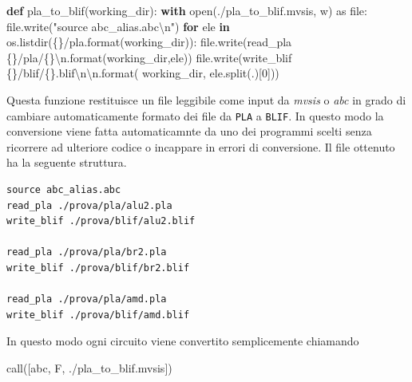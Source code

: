 \documentclass[
]{book}
\newenvironment{Shaded}{\begin{snugshade}}{\end{snugshade}}
\newcommand{\BuiltInTok}[1]{#1}
\newcommand{\CharTok}[1]{\textcolor[rgb]{0.31,0.60,0.02}{#1}}
\newcommand{\ControlFlowTok}[1]{\textcolor[rgb]{0.13,0.29,0.53}{\textbf{#1}}}
\newcommand{\DecValTok}[1]{\textcolor[rgb]{0.00,0.00,0.81}{#1}}
\newcommand{\ImportTok}[1]{#1}
\newcommand{\KeywordTok}[1]{\textcolor[rgb]{0.13,0.29,0.53}{\textbf{#1}}}
\newcommand{\NormalTok}[1]{#1}
\newcommand{\SpecialCharTok}[1]{\textcolor[rgb]{0.00,0.00,0.00}{#1}}
\newcommand{\StringTok}[1]{\textcolor[rgb]{0.31,0.60,0.02}{#1}}
\begin{document}
\begin{Shaded}
\begin{Highlighting}[]
\KeywordTok{def}\NormalTok{ pla\_to\_blif(working\_dir):}
  \ControlFlowTok{with} \BuiltInTok{open}\NormalTok{(}\StringTok{\textquotesingle{}./pla\_to\_blif.mvsis\textquotesingle{}}\NormalTok{, }\StringTok{\textquotesingle{}w\textquotesingle{}}\NormalTok{) }\ImportTok{as} \BuiltInTok{file}\NormalTok{:}
    \BuiltInTok{file}\NormalTok{.write(}\StringTok{"source abc\_alias.abc}\CharTok{\textbackslash{}n}\StringTok{"}\NormalTok{)}
    \ControlFlowTok{for}\NormalTok{ ele }\KeywordTok{in}\NormalTok{ os.listdir(}\StringTok{\textquotesingle{}}\SpecialCharTok{\{\}}\StringTok{/pla\textquotesingle{}}\NormalTok{.}\BuiltInTok{format}\NormalTok{(working\_dir)):}
      \BuiltInTok{file}\NormalTok{.write(}\StringTok{\textquotesingle{}read\_pla }\SpecialCharTok{\{\}}\StringTok{/pla/}\SpecialCharTok{\{\}}\CharTok{\textbackslash{}n}\StringTok{\textquotesingle{}}\NormalTok{.}\BuiltInTok{format}\NormalTok{(working\_dir,ele))}
      \BuiltInTok{file}\NormalTok{.write(}\StringTok{\textquotesingle{}write\_blif }\SpecialCharTok{\{\}}\StringTok{/blif/}\SpecialCharTok{\{\}}\StringTok{.blif}\CharTok{\textbackslash{}n\textbackslash{}n}\StringTok{\textquotesingle{}}\NormalTok{.}\BuiltInTok{format}\NormalTok{(}
\NormalTok{        working\_dir, ele.split(}\StringTok{\textquotesingle{}.\textquotesingle{}}\NormalTok{)[}\DecValTok{0}\NormalTok{]))}
\end{Highlighting}
\end{Shaded}

Questa funzione restituisce un file leggibile come input da \emph{mvsis} o \emph{abc} in grado di cambiare automaticamente formato dei file da \texttt{PLA} a \texttt{BLIF}. In questo modo la conversione viene fatta automaticamnte da uno dei programmi scelti senza ricorrere ad ulteriore codice o incappare in errori di conversione. Il file ottenuto ha la seguente struttura.

\begin{verbatim}
source abc_alias.abc
read_pla ./prova/pla/alu2.pla
write_blif ./prova/blif/alu2.blif

read_pla ./prova/pla/br2.pla
write_blif ./prova/blif/br2.blif

read_pla ./prova/pla/amd.pla
write_blif ./prova/blif/amd.blif
\end{verbatim}

In questo modo ogni circuito viene convertito semplicemente chiamando

\begin{Shaded}
\begin{Highlighting}[]
\NormalTok{call([}\StringTok{\textquotesingle{}abc\textquotesingle{}}\NormalTok{, }\StringTok{\textquotesingle{}{-}F\textquotesingle{}}\NormalTok{, }\StringTok{\textquotesingle{}./pla\_to\_blif.mvsis\textquotesingle{}}\NormalTok{])}
\end{Highlighting}
\end{Shaded}
\end{document}
